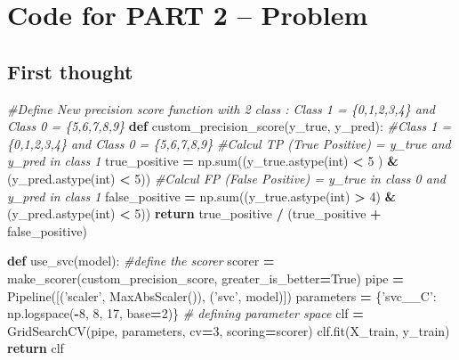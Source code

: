 \documentclass[10pt,a4paper]{article}
\newenvironment{Shaded}{\begin{snugshade}}{\end{snugshade}}
\newcommand{\BuiltInTok}[1]{#1}
\newcommand{\CommentTok}[1]{\textcolor[rgb]{0.56,0.35,0.01}{\textit{#1}}}
\newcommand{\ControlFlowTok}[1]{\textcolor[rgb]{0.13,0.29,0.53}{\textbf{#1}}}
\newcommand{\DecValTok}[1]{\textcolor[rgb]{0.00,0.00,0.81}{#1}}
\newcommand{\KeywordTok}[1]{\textcolor[rgb]{0.13,0.29,0.53}{\textbf{#1}}}
\newcommand{\NormalTok}[1]{#1}
\newcommand{\OperatorTok}[1]{\textcolor[rgb]{0.81,0.36,0.00}{\textbf{#1}}}
\newcommand{\StringTok}[1]{\textcolor[rgb]{0.31,0.60,0.02}{#1}}
\newcommand{\VariableTok}[1]{\textcolor[rgb]{0.00,0.00,0.00}{#1}}
\theoremstyle{break}
\begin{document}
\newpage

\hypertarget{annexe:annexe2}{%
\section{Code for PART 2 -- Problem}\label{annexe:annexe2}}

\hypertarget{first-thought-1}{%
\subsection{First thought}\label{first-thought-1}}

\begin{Shaded}
\begin{Highlighting}[]
\CommentTok{#Define New precision score function with 2 class : Class 1 = \{0,1,2,3,4\} and Class 0 = \{5,6,7,8,9\}}
\KeywordTok{def}\NormalTok{ custom_precision_score(y_true, y_pred):}
    \CommentTok{#Class 1 = \{0,1,2,3,4\} and Class 0 = \{5,6,7,8,9\}}
    \CommentTok{#Calcul TP (True Positive) = y_true and y_pred in class 1}
\NormalTok{    true_positive }\OperatorTok{=}\NormalTok{ np.}\BuiltInTok{sum}\NormalTok{((y_true.astype(}\BuiltInTok{int}\NormalTok{) }\OperatorTok{<} \DecValTok{5}\NormalTok{ ) }\OperatorTok{&}\NormalTok{ (y_pred.astype(}\BuiltInTok{int}\NormalTok{) }\OperatorTok{<} \DecValTok{5}\NormalTok{))}
    \CommentTok{#Calcul FP (False Positive) = y_true in class 0 and y_pred in class 1}
\NormalTok{    false_positive }\OperatorTok{=}\NormalTok{ np.}\BuiltInTok{sum}\NormalTok{((y_true.astype(}\BuiltInTok{int}\NormalTok{) }\OperatorTok{>} \DecValTok{4}\NormalTok{) }\OperatorTok{&}\NormalTok{ (y_pred.astype(}\BuiltInTok{int}\NormalTok{) }\OperatorTok{<} \DecValTok{5}\NormalTok{))}
    \ControlFlowTok{return}\NormalTok{ true_positive }\OperatorTok{/}\NormalTok{ (true_positive }\OperatorTok{+}\NormalTok{ false_positive)}
\end{Highlighting}
\end{Shaded}

\begin{Shaded}
\begin{Highlighting}[]
\KeywordTok{def}\NormalTok{ use_svc(model):}
    \CommentTok{#define the scorer}
\NormalTok{    scorer }\OperatorTok{=}\NormalTok{ make_scorer(custom_precision_score, greater_is_better}\OperatorTok{=}\VariableTok{True}\NormalTok{)}
\NormalTok{    pipe }\OperatorTok{=}\NormalTok{ Pipeline([(}\StringTok{'scaler'}\NormalTok{, MaxAbsScaler()), (}\StringTok{'svc'}\NormalTok{, model)])}
\NormalTok{    parameters }\OperatorTok{=}\NormalTok{ \{}\StringTok{'svc__C'}\NormalTok{: np.logspace(}\OperatorTok{-}\DecValTok{8}\NormalTok{, }\DecValTok{8}\NormalTok{, }\DecValTok{17}\NormalTok{, base}\OperatorTok{=}\DecValTok{2}\NormalTok{)\} }\CommentTok{# defining parameter space}
\NormalTok{    clf }\OperatorTok{=}\NormalTok{ GridSearchCV(pipe, parameters, cv}\OperatorTok{=}\DecValTok{3}\NormalTok{, scoring}\OperatorTok{=}\NormalTok{scorer)}
\NormalTok{    clf.fit(X_train, y_train)}
    \ControlFlowTok{return}\NormalTok{ clf}
\end{Highlighting}
\end{Shaded}
\end{document}

